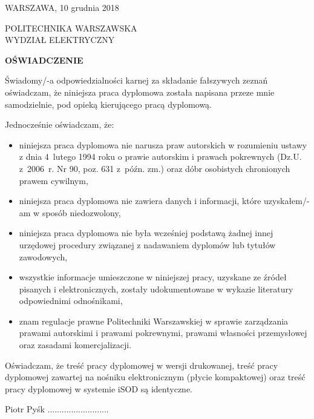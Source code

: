 \begin{flushright}
WARSZAWA, 10 grudnia 2018
\end{flushright}

\begin{flushleft}
POLITECHNIKA WARSZAWSKA \\
WYDZIAŁ ELEKTRYCZNY
\end{flushleft}

\begin{center}
\textbf{OŚWIADCZENIE}
\end{center}

Świadomy/-a odpowiedzialności karnej za składanie fałszywych zeznań oświadczam, że
niniejsza praca dyplomowa została napisana przeze mnie samodzielnie, pod opieką kierującego
pracą dyplomową.

Jednocześnie oświadczam, że:
\begin{itemize}
\item niniejsza praca dyplomowa nie narusza praw autorskich w rozumieniu ustawy z dnia
4~lutego 1994 roku o prawie autorskim i prawach pokrewnych (Dz.U. z~2006~r. Nr 90, poz.
631 z~późn. zm.) oraz dóbr osobistych chronionych prawem cywilnym,
\item niniejsza praca
dyplomowa nie zawiera danych i informacji, które uzyskałem/-am w sposób niedozwolony,
\item niniejsza praca dyplomowa nie była wcześniej podstawą żadnej innej urzędowej
procedury związanej z nadawaniem dyplomów lub tytułów zawodowych,
\item wszystkie
informacje umieszczone w niniejszej pracy, uzyskane ze źródeł pisanych i elektronicznych,
zostały udokumentowane w wykazie literatury odpowiednimi odnośnikami,
\item znam
regulacje prawne Politechniki Warszawskiej w sprawie zarządzania prawami autorskimi i
prawami pokrewnymi, prawami własności przemysłowej oraz zasadami komercjalizacji.
\end{itemize}

Oświadczam, że treść pracy dyplomowej w wersji drukowanej, treść pracy dyplomowej
zawartej na nośniku elektronicznym (płycie kompaktowej) oraz treść pracy dyplomowej w
systemie iSOD są identyczne.

\begin{flushright}
  Piotr Pyśk ..........................
\end{flushright}

\cleardoublepage